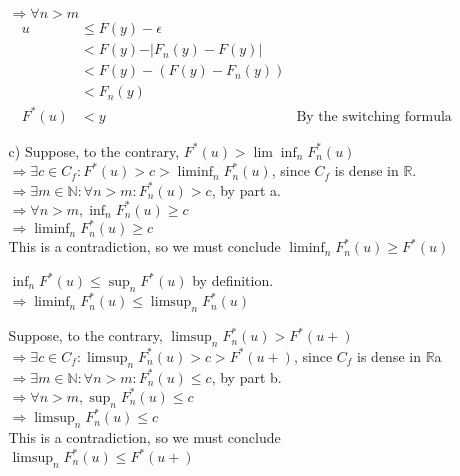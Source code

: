 \documentclass[11pt]{article}
\newcommand{\R}{\mathbb{R}}
\newcommand{\N}{\mathbb{N}}
\theoremstyle{definition}
\begin{document}
\begin{itemize}
\begin{itemize}
                \(\Rightarrow \forall n>m \)
                \begin{align*}
                        u &\leq F(y) - \epsilon \\
                          &<    F(y) - \vert F_n(y) - F(y) \vert \\
                          &<    F(y) - (F(y) -  F_n(y)) \\
                          &<    F_n(y)                  \\
                    F^*(u)&<      y                            & \mbox{By the switching formula}
                \end{align*}
            \item[c)]
                Suppose, to the contrary, \(F^*(u) > \lim \inf_n F_n^*(u) \) \\
                \( \Rightarrow \exists c\in C_f: F^*(u) > c > \liminf_n F_n^*(u) \), since $C_f$ is dense in $\R$. \\
                \( \Rightarrow \exists m \in \N: \forall n>m: F_n^*(u)>c \), by part a. \\
                \( \Rightarrow \forall n>m, \inf_n F_n^*(u) \geq c \) \\
                \( \Rightarrow \liminf_n F_n^*(u) \geq c \) \\
                This is a contradiction, so we must conclude \(\liminf_n F_n^*(u)\geq F^*(u)\)
                \smallskip

                \( \inf_n F^*(u) \leq \sup_n F^*(u) \) by definition. \\
                \( \Rightarrow \liminf_n F_n^*(u)\leq \limsup_n F_n^*(u) \)
                \smallskip 

                Suppose, to the contrary, \(\limsup_n F_n^*(u) > F^*(u+) \) \\
                \( \Rightarrow \exists c \in C_f: \limsup_n F_n^*(u) > c > F^*(u+) \), since $C_f$ is dense in $\R$a \\ 
                \( \Rightarrow \exists m \in \N: \forall n>m: F_n^*(u)\leq c \), by part b. \\
                \( \Rightarrow \forall n>m, \sup_n F_n^*(u) \leq c \) \\
                \( \Rightarrow \limsup_n F_n^*(u) \leq c \) \\
                This is a contradiction, so we must conclude \(\limsup_n F_n^*(u)\leq F^*(u+)\)
                \smallskip 


\end{itemize}
\end{itemize}
\end{document}
